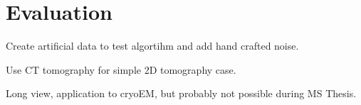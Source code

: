 \chapter{Evaluation}
\label{sec:evaluation}


Create artificial data to test algortihm
and add hand crafted noise.

Use CT tomography for simple 2D tomography case.

Long view, application to cryoEM, 
but probably not possible during MS Thesis.
